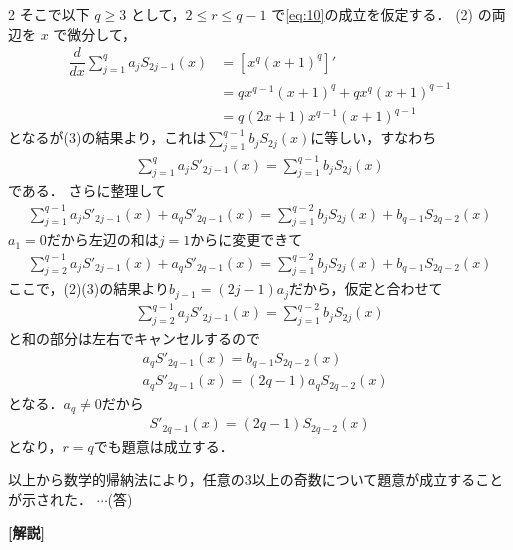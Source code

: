\documentclass[../../main.tex]{subfiles}
\begin{document}
\begin{multicols}{2}
  そこで以下 $q \ge 3$ として，$2 \le r \le q-1$ で\cref{eq:10}の成立を仮定する．
  (2) の両辺を $x$ で微分して，
  \begin{align}
    \dfrac{d}{dx} \sum_{j=1}^{q} a_j S_{2j-1}(x)
    & = \left[x^{q}(x+1)^{q}\right]'          \\
    & = qx^{q-1}(x+1)^{q} + qx^{q}(x+1)^{q-1} \\
    & = q(2x+1)x^{q-1}(x+1)^{q-1}
  \end{align}
  となるが(3)の結果より，これは$\sum_{j=1}^{q-1} b_{j} S_{2j}(x)$に等しい，すなわち
  \begin{align}
    \sum_{j=1}^{q} a_j S'_{2j-1}(x) = \sum_{j=1}^{q-1} b_{j} S_{2j}(x)
  \end{align}
  である．
  さらに整理して
  \begin{align}
    \sum_{j=1}^{q-1} a_j S'_{2j-1}(x) + a_{q}S'_{2q-1}(x) = \sum_{j=1}^{q-2} b_{j} S_{2j}(x) + b_{q-1} S_{2q-2}(x)
  \end{align}
  $a_1=0$だから左辺の和は$j=1$からに変更できて
  \begin{align}
    \sum_{j=2}^{q-1} a_j S'_{2j-1}(x) + a_{q}S'_{2q-1}(x) = \sum_{j=1}^{q-2} b_{j} S_{2j}(x) + b_{q-1} S_{2q-2}(x)
  \end{align}
  ここで，(2)(3)の結果より$b_{j-1} = (2j-1)a_{j}$だから，仮定と合わせて
  \begin{align}
    \sum_{j=2}^{q-1} a_j S'_{2j-1}(x) = \sum_{j=1}^{q-2} b_{j} S_{2j}(x)
  \end{align}
  と和の部分は左右でキャンセルするので
  \begin{align}
    & a_{q}S'_{2q-1}(x) =  b_{q-1} S_{2q-2}(x)     \\
    & a_{q}S'_{2q-1}(x) =  (2q-1)a_{q} S_{2q-2}(x)
  \end{align}
  となる．$a_{q}\neq 0$だから
  \begin{align}
    S'_{2q-1}(x) =  (2q-1) S_{2q-2}(x)
  \end{align}
  となり，$r=q$でも題意は成立する．

  以上から数学的帰納法により，任意の$3$以上の奇数について題意が成立することが示された．  $\cdots$(答)

  {\bf [解説]}

  \newpage
\end{multicols}
\end{document}
